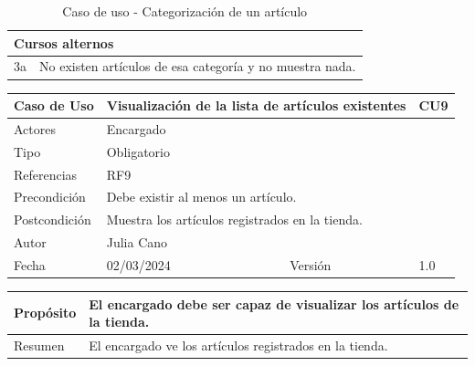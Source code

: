 \begin{table}[H]
	\centering
	\begin{tabular}{| m{} | m{} | m{} | m{} |}
		\hline
		\multicolumn{4}{|m{0.9\textwidth}|}{Cursos alternos}     \\ 
		\hline
		3a & \multicolumn{3}{m{0.67\textwidth}|}{No existen artículos de esa categoría y no muestra nada.} \\ 
		\hline
	\end{tabular}
	\caption{Caso de uso - Categorización de un artículo}
\end{table}

\newpage


\begin{table}[H]
	\centering
	\begin{tabular}{| m{} | m{} | m{} | m{}|}
		\hline
		\rowcolor{grayshade} Caso de Uso & \multicolumn{2}{|m{0.43\textwidth}|}{Visualización de la lista de artículos existentes} &  CU9\\ 
		\hline
		Actores & \multicolumn{3}{l|}{Encargado} \\ 
		\hline
		Tipo & \multicolumn{3}{l|}{Obligatorio} \\ 
		\hline
		Referencias & \multicolumn{3}{l|}{RF9} \\ 
		\hline
		Precondición & \multicolumn{3}{m{0.67\textwidth}|}{Debe existir al menos un artículo.} \\ 
		\hline
		Postcondición & \multicolumn{3}{m{0.67\textwidth}|}{Muestra los artículos registrados en la tienda.} \\ 
		\hline
		Autor & \multicolumn{3}{l|}{Julia Cano} \\ 
		\hline
		Fecha & 02/03/2024 & Versión & 1.0 \\
		\hline
	\end{tabular}
\end{table}

\begin{table}[H]
	\centering
	\begin{tabular}{| m{} | m{} | m{} | m{} |}
		\hline
		Propósito & \multicolumn{3}{m{0.67\textwidth}|}{El encargado debe ser capaz de visualizar los artículos de la tienda.}  \\ 
		\hline
		Resumen & \multicolumn{3}{m{0.67\textwidth}|}{El encargado ve los artículos registrados en la tienda.} \\ 
		\hline
	\end{tabular}
\end{table}


